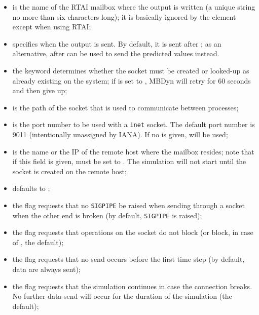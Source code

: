 \begin{itemize}
\item {} is the name of the RTAI mailbox where 
the output is written  (a unique string no more than six characters long);
it is basically ignored by the  element
except when using RTAI;

\item {} specifies when the output is sent.
By default, it is sent after ; as an alternative, after  can be used
to send the predicted values instead.

\item the  keyword determines whether the socket
must be created or looked-up as already existing on the system;
if  is set to , MBDyn will retry for 60 seconds
and then give up;

\item {} is the path of the  socket 
that is used to communicate between processes;

\item {} is the port number to be used with a \texttt{inet} socket.
The default port number is 9011 (intentionally unassigned by IANA).
If no  is given,  will be used;

\item {} is the name or the IP of the remote host where
the mailbox resides; note that if this field is given,  must
be set to .
The simulation will not start until the socket is created on the remote host;

\item {} defaults to ;

\item the flag  requests that no \texttt{SIGPIPE} be raised
when sending through a socket when the other end is broken
(by default, \texttt{SIGPIPE} is raised);

\item the flag  requests that operations on the socket
do not block (or block, in case of , the default);

\item the flag  requests that no send occurs before
the first time step (by default, data are always sent);

\item the flag  requests that the simulation
continues in case the connection breaks.
No further data send will occur for the duration of the simulation
(the default);


\end{itemize}
